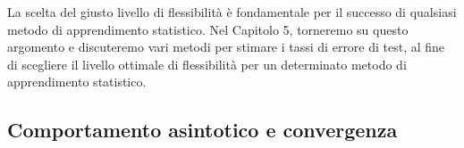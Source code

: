 La scelta del giusto livello di flessibilità è fondamentale per il successo di qualsiasi metodo di apprendimento statistico. Nel Capitolo 5, torneremo su questo argomento e discuteremo vari metodi per stimare i tassi di errore di test, al fine di scegliere il livello ottimale di flessibilità per un determinato metodo di apprendimento statistico.

\subsection{Comportamento asintotico e convergenza}
